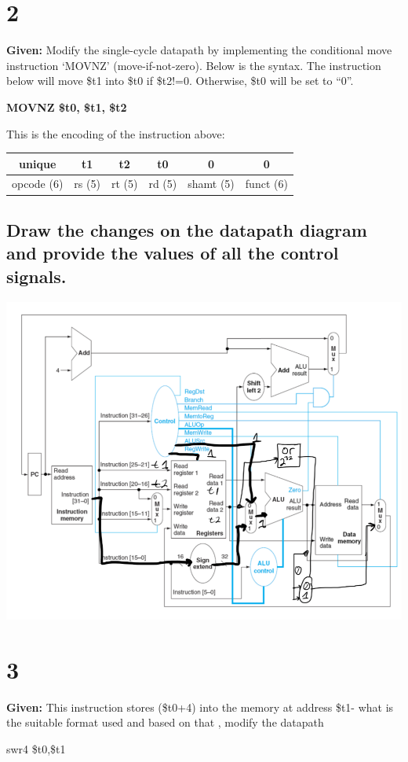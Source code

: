 \documentclass{article}
\begin{document}
\section{2}
\textbf{Given:} Modify the single-cycle datapath by implementing the conditional move instruction ‘MOVNZ’ (move-if-not-zero). Below is the syntax. The instruction below will move \$t1 into \$t0 if \$t2!=0. Otherwise, \$t0 will be set to “0”.
\begin{center}
  \textbf{MOVNZ \$t0, \$t1, \$t2}
\end{center}
This is the encoding of the instruction above:
\begin{center}
  \begin{tabular}{|c|c|c|c|c|c|}
    \hline
    unique & t1 & t2 & t0 & 0 & 0 \\
    \hline\hline
    opcode (6) & rs (5) & rt (5) & rd (5) & shamt (5) & funct (6) \\
    \hline
  \end{tabular}
\end{center}

\subsection{Draw the changes on the datapath diagram and provide the values of all the control signals.}
\includegraphics[width=\textwidth]{q2.png}

\section{3}
\textbf{Given:} This instruction stores (\$t0+4) into the memory at address \$t1- what is the suitable format used and based on that , modify the datapath
\begin{center}
  swr4  \$t0,\$t1
\end{center}
\end{document}
